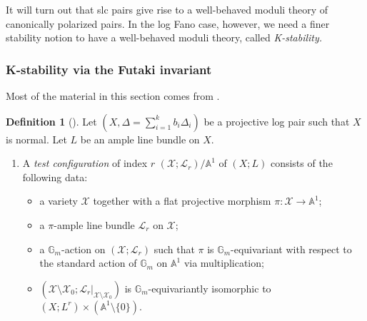 \documentclass[11pt]{amsart}
\numberwithin{equation}{section}
\theoremstyle{definition}
\newtheorem{defn}[theorem]{Definition}
\newcommand{\bG}{\mathbb{G}}
\newcommand{\bA}{\mathbb{A}}
\newcommand{\cX}{\mathcal X}
\newcommand{\cL}{\mathcal L}
\begin{document}
It will turn out that slc pairs give rise to a well-behaved moduli theory of canonically polarized pairs.  In the log Fano case, however, we need a finer stability notion to have a well-behaved moduli theory, called \textit{K-stability.}


\subsubsection{K-stability via the Futaki invariant}

Most of the material in this section comes from \cite{Chenyang}. 

\begin{defn}[\cite{Tian, Donaldson}]
Let $(X,\Delta=\sum_{i=1}^k b_i \Delta_i)$ be a projective log pair such that $X$ is normal. Let $L$ be an ample line bundle on $X$.
\begin{enumerate}[label=(\alph*)]
\item A \emph{test configuration} of index $r$ $(\cX;\cL_r)/\bA^1$ of $(X;L)$ consists of the following data:
\begin{itemize}
 \item a variety $\cX$ together with a flat projective morphism $\pi:\cX\to \bA^1$;
 \item a $\pi$-ample line bundle $\cL_r$ on $\cX$;
 \item a $\bG_m$-action on $(\cX;\cL_r)$ such that $\pi$ is $\bG_m$-equivariant with respect to the standard action of $\bG_m$ on $\bA^1$ via multiplication;
 \item $(\cX\setminus\cX_0;\cL_r|_{\cX\setminus\cX_0})$
 is $\bG_m$-equivariantly isomorphic to $(X;L^r)\times(\bA^1\setminus\{0\})$.
\end{itemize}
 

\end{enumerate}
\end{defn}
\end{document}
